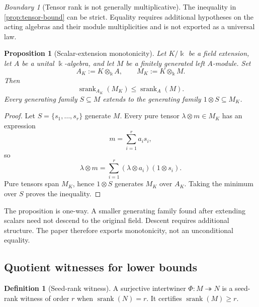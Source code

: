 \documentclass[11pt]{article}
\newtheorem{proposition}[proposition]{Proposition}
\theoremstyle{definition}
\newtheorem{definition}[definition]{Definition}
\theoremstyle{remark}
\newtheorem{boundary}[boundary]{Boundary}
\theoremstyle{definition}\newtheorem{example}[theorem]{Example}
\newcommand{\bbk}{\Bbbk}
\newcommand{\srank}{\operatorname{srank}}
\newcommand{\RecordID}[1]{\label{record:#1}}
\newcommand{\Depends}[1]{}
\newcommand{\Exports}[1]{}
\begin{document}
\begin{boundary}[Tensor rank is not generally multiplicative]
\label{bnd:tensor-nonequality}
The inequality in \cref{prop:tensor-bound} can be strict.  Equality requires additional hypotheses on the acting algebras and their module multiplicities and is not exported as a universal law.
\end{boundary}
\RecordID{PSC-I-B-TENSOR-NONEQUALITY}



\begin{proposition}[Scalar-extension monotonicity]
\label{prop:scalar-extension}
Let \(K/\bbk\) be a field extension, let \(A\) be a unital \(\bbk\)-algebra, and let \(M\) be a finitely generated left \(A\)-module.  Set
\[
A_K:=K\otimes_{\bbk}A,
\qquad
M_K:=K\otimes_{\bbk}M.
\]
Then
\[
\boxed{
\srank_{A_K}(M_K)\leq\srank_A(M).
}
\]
Every generating family \(S\subseteq M\) extends to the generating family \(1\otimes S\subseteq M_K\).
\end{proposition}
\RecordID{PSC-I-P-SCALAR-EXTENSION-MONOTONICITY}
\Depends{PSC-I-D-SEED-RANK.}
\Exports{Coefficient-field extension in the arithmetic, quantum, and representation-theoretic realizations.}

\begin{proof}
Let \(S=\{s_1,\ldots,s_r\}\) generate \(M\).  Every pure tensor \(\lambda\otimes m\in M_K\) has an expression
\[
m=\sum_{i=1}^r a_is_i,
\]
so
\[
\lambda\otimes m
=
\sum_{i=1}^r(\lambda\otimes a_i)(1\otimes s_i).
\]
Pure tensors span \(M_K\), hence \(1\otimes S\) generates \(M_K\) over \(A_K\).  Taking the minimum over \(S\) proves the inequality.
\end{proof}

\begin{hypothesisguide}
The proposition is one-way.  A smaller generating family found after extending scalars need not descend to the original field.  Descent requires additional structure.  The paper therefore exports monotonicity, not an unconditional equality.
\end{hypothesisguide}


\subsection{Quotient witnesses for lower bounds}
\begin{definition}[Seed-rank witness]
\label{def:seed-rank-witness}
A surjective intertwiner $\Phi:M\twoheadrightarrow N$ is a seed-rank witness of order $r$ when $\srank(N)=r$.  It certifies $\srank(M)\geq r$.
\end{definition}
\RecordID{PSC-I-D-SEED-RANK-WITNESS}
\end{document}
